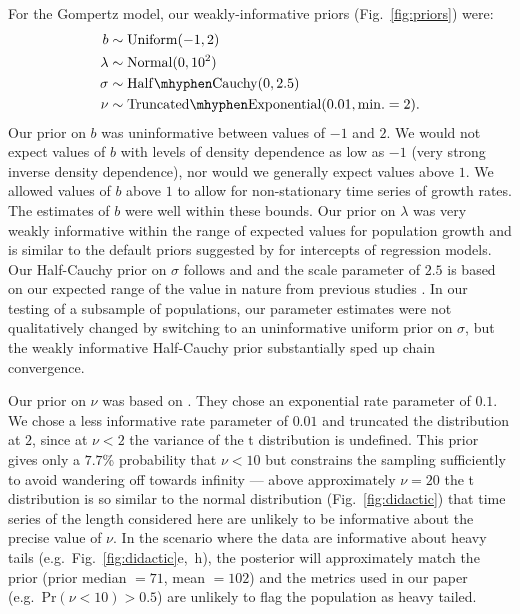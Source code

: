 For the Gompertz model, our weakly-informative priors (Fig.~\ref{fig:priors}) were:
\begin{align*}
b &\sim \mathrm{Uniform}(-1, 2)\\ \lambda &\sim \mathrm{Normal}(0, 10^2)\\
\sigma &\sim \mathrm{Half\mhyphen Cauchy} (0, 2.5)\\ \nu &\sim
\mathrm{Truncated\mhyphen Exponential}(0.01, \mathrm{min.} = 2). \end{align*}
Our prior on $b$ was uninformative between values of $-1$ and $2$. We would not
expect values of $b$ with levels of density dependence as low as $-1$ (very
strong inverse density dependence), nor would we generally expect values above
$1$. We allowed values of $b$ above $1$ to allow for non-stationary time series
of growth rates. The estimates of $b$ were well within these bounds. Our prior
on $\lambda$ was very weakly informative within the range of expected values
for population growth and is similar to the default priors suggested by
\citet{gelman2008d} for intercepts of regression models. Our Half-Cauchy prior
on $\sigma$ follows \citet{gelman2006c} and \citet{gelman2008d} and the scale
parameter of $2.5$ is based on our expected range of the value in nature from
previous studies \citep[e.g.][]{connors2014}. In our testing of a subsample of
populations, our parameter estimates were not qualitatively changed by
switching to an uninformative uniform prior on $\sigma$, but the weakly
informative Half-Cauchy prior substantially sped up chain convergence.

Our prior on $\nu$ was based on \citet{fernandez1998}. They chose an
exponential rate parameter of $0.1$. We chose a less informative rate
parameter of $0.01$ and truncated the distribution at $2$, since at $\nu < 2$
the variance of the t distribution is undefined. This prior gives only
a $7.7$\% probability that $\nu < 10$ but constrains the sampling sufficiently
to avoid wandering off towards infinity --- above approximately $\nu = 20$ the
t distribution is so similar to the normal distribution
(Fig.~\ref{fig:didactic}) that time series of the length considered here are
unlikely to be informative about the precise value of $\nu$. In the scenario
where the data are informative about heavy tails
(e.g.~Fig.~\ref{fig:didactic}e,~h), the posterior will approximately match the
prior (prior median $= 71$, mean $= 102$) and the metrics used in our paper
(e.g.~Pr$(\nu < 10) > 0.5$) are unlikely to flag the population as heavy
tailed.

